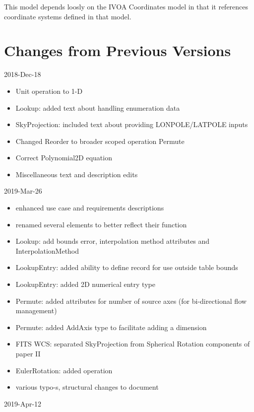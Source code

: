 \documentclass[11pt,a4paper]{ivoa}
\begin{document}
This model depends loosly on the IVOA Coordinates model in that it references coordinate systems defined in that model.



\appendix
\section{Changes from Previous Versions}

2018-Dec-18
\begin{itemize}
\item Unit operation to 1-D
\item Lookup: added text about handling enumeration data
\item SkyProjection: included text about providing LONPOLE/LATPOLE inputs
\item Changed Reorder to broader scoped operation Permute
\item Correct Polynomial2D equation
\item Miscellaneous text and description edits
\end{itemize}
2019-Mar-26
\begin{itemize}
\item enhanced use case and requirements descriptions
\item renamed several elements to better reflect their function
\item Lookup: add bounds error, interpolation method attributes and InterpolationMethod
\item LookupEntry: added ability to define record for use outside table bounds
\item LookupEntry: added 2D numerical entry type
\item Permute: added attributes for number of source axes (for bi-directional flow management)
\item Permute: added AddAxis type to facilitate adding a dimension
\item FITS WCS: separated SkyProjection from Spherical Rotation components of paper II
\item EulerRotation: added operation
\item various typo-s, structural changes to document
\end{itemize}
2019-Apr-12
\end{document}

